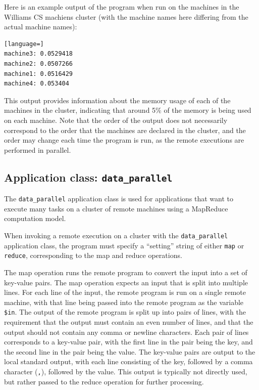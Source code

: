 \documentclass[twoside]{report}
\begin{document}
Here is an example output of the program when run on the machines in the Williams CS machiens cluster (with the machine names here differing from the actual machine names):

\begin{minipage}[c]{\textwidth-15pt}
  \begin{lstlisting}[language=]
machine3: 0.0529418
machine2: 0.0507266
machine1: 0.0516429
machine4: 0.053404
\end{lstlisting}
  \smallskip
\end{minipage}

This output provides information about the memory usage of each of the machines in the cluster, indicating that around 5\% of the memory is being used on each machine.
Note that the order of the output does not necessarily correspond to the order that the machines are declared in the cluster, and the order may change each time the program is run, as the remote executions are performed in parallel.

\subsection{Application class: \texttt{data\_parallel}}

The \texttt{data\_parallel} application class is used for applications that want to execute many tasks on a cluster of remote machines using a MapReduce computation model.

When invoking a remote execution on a cluster with the \texttt{data\_parallel} application class, the program must specify a ``setting'' string of either \texttt{map} or \texttt{reduce}, corresponding to the map and reduce operations.

The map operation runs the remote program to convert the input into a set of key-value pairs.
The map operation expects an input that is split into multiple lines.
For each line of the input, the remote program is run on a single remote machine, with that line being passed into the remote program as the variable \texttt{\$in}.
The output of the remote program is split up into pairs of lines, with the requirement that the output must contain an even number of lines, and that the output should not contain any comma or newline characters.
Each pair of lines corresponds to a key-value pair, with the first line in the pair being the key, and the second line in the pair being the value.
The key-value pairs are output to the local standard output, with each line consisting of the key, followed by a comma character (\texttt{,}), followed by the value.
This output is typically not directly used, but rather passed to the reduce operation for further processing.
\end{document}
